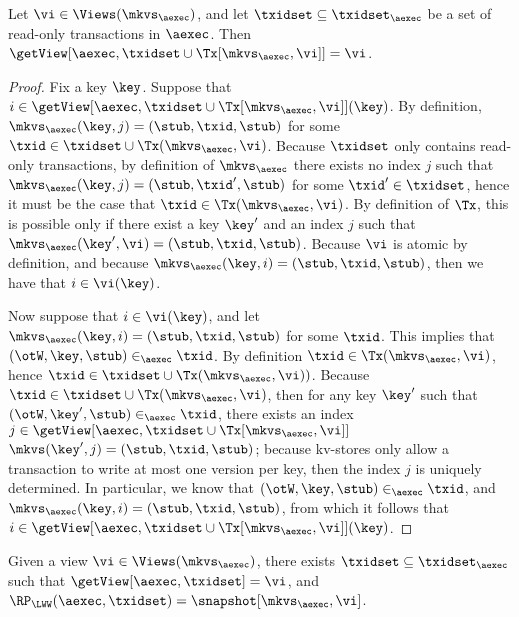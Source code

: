 \begin{proposition}
\label{prop:getview.tx}
Let $\vi \in \Views(\mkvs_{\aexec})$, and let $\txidset \subseteq \txidset_{\aexec}$ be a 
set of read-only transactions in $\aexec$. Then 
$\getView[\aexec, \txidset \cup \Tx[\mkvs_{\aexec}, \vi]] = \vi$. 
\end{proposition}

\begin{proof}
Fix a key $\key$. Suppose that $i \in \getView[\aexec, \txidset \cup \Tx[\mkvs_{\aexec}, \vi]](\key)$. 
By definition, $\mkvs_{\aexec}(\key, j) = (\stub, \txid, \stub)$ for some $\txid \in \txidset \cup \Tx(\mkvs_{\aexec}, \vi)$. 
Because $\txidset$ only contains read-only transactions, by definition of $\mkvs_{\aexec}$ there exists 
no index $j$ such that $\mkvs_{\aexec}(\key, j) = (\stub, \txid', \stub)$ for some $\txid' \in \txidset$, 
hence it must be the case that $\txid \in \Tx(\mkvs_{\aexec}, \vi)$. By definition of $\Tx$, 
this is possible only if there exist a key $\key'$ and an index $j$ such that $\mkvs_{\aexec}(\key', \vi) = (\stub, \txid, \stub)$. 
Because $\vi$ is atomic by definition, and because $\mkvs_{\aexec}(\key, i) = (\stub, \txid, \stub)$, then we have that $i \in \vi(\key)$. 

Now suppose that $i \in \vi(\key)$, and let $\mkvs_{\aexec}(\key, i) = (\stub, \txid, \stub)$ for some $\txid$. 
This implies that $(\otW, \key, \stub) \in_{\aexec} \txid$.
By definition $\txid \in \Tx(\mkvs_{\aexec}, \vi)$, hence $\txid \in \txidset \cup \Tx(\mkvs_{\aexec}, \vi))$. 
Because $\txid \in \txidset \cup \Tx(\mkvs_{\aexec}, \vi)$, then for any key $\key'$ such that 
$(\otW, \key', \stub) \in_{\aexec} \txid$, there exists an index $j \in \getView[\aexec, \txidset \cup \Tx[\mkvs_{\aexec}, \vi]]$ 
$\mkvs(\key', j) = (\stub, \txid, \stub)$; because kv-stores only allow a transaction to write at most one version 
per key, then the index $j$ is uniquely determined. In particular, we know that $(\otW, \key, \stub) \in_{\aexec} \txid$, 
and $\mkvs_{\aexec}(\key, i) = (\stub, \txid, \stub)$, from which it follows that $i \in \getView[\aexec, \txidset \cup \Tx[\mkvs_{\aexec}, \vi]](\key)$.
\end{proof}


\begin{proposition}
\label{prop:compatible.kv2aexec}
Given a view $\vi \in \Views(\mkvs_{\aexec})$, there exists $\txidset \subseteq \txidset_{\aexec}$ 
such that $\getView[\aexec, \txidset] = \vi$, and $\RP_{\LWW}(\aexec, \txidset) = \snapshot[\mkvs_{\aexec}, \vi]$.
\end{proposition}

